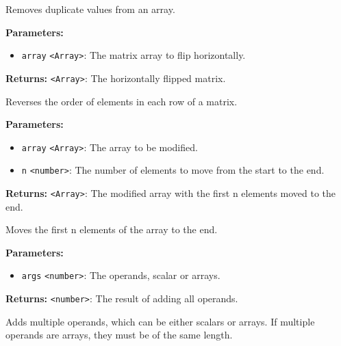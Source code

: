 \documentclass[12pt,a4paper]{article}
\begin{document}
\noindent Removes duplicate values from an array.

\vspace{5mm}
\noindent {}


\noindent \textbf{Parameters:}
\begin{itemize}
  \item \texttt{array} \texttt{<Array>}: The matrix array to flip horizontally.
\end{itemize}

\noindent \textbf{Returns:} \texttt{<Array>}: The horizontally flipped matrix.

\noindent Reverses the order of elements in each row of a matrix.

\vspace{5mm}
\noindent {}


\noindent \textbf{Parameters:}
\begin{itemize}
  \item \texttt{array} \texttt{<Array>}: The array to be modified.
  \item \texttt{n} \texttt{<number>}: The number of elements to move from the start to the end.
\end{itemize}

\noindent \textbf{Returns:} \texttt{<Array>}: The modified array with the first \textasciigrave{}n\textasciigrave{} elements moved to the end.

\noindent Moves the first \textasciigrave{}n\textasciigrave{} elements of the array to the end.

\vspace{5mm}
\noindent {}


\noindent \textbf{Parameters:}
\begin{itemize}
  \item \texttt{args} \texttt{<number>}: The operands, scalar or arrays.
\end{itemize}

\noindent \textbf{Returns:} \texttt{<number>}: The result of adding all operands.

\noindent Adds multiple operands, which can be either scalars or arrays.
If multiple operands are arrays, they must be of the same length.
\end{document}
